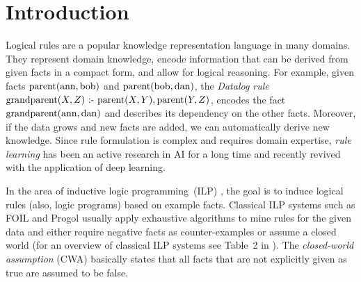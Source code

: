 \section{Introduction}


Logical rules are a popular knowledge representation language in many domains. They represent %
domain knowledge, encode information that can be derived from given facts in a compact form, and allow for logical reasoning.
For example, given facts $\textrm{parent}(\textrm{ann},\textrm{bob})$ and $\textrm{parent}(\textrm{bob},\textrm{dan})$, the \emph{Datalog rule} 
$\textrm{grandparent}(X,Z)\text{ :- }\textrm{parent}(X,Y),\textrm{parent}(Y,Z)$, encodes the fact $\textrm{grandparent}(\textrm{ann},\textrm{dan})$ and describes its dependency on the other facts. Moreover, if the data grows and new facts are added, we can automatically derive new knowledge.
% 
Since rule formulation is complex and requires domain expertise,
\emph{rule learning} \cite{Raedt-08-Logical-and-relational-learning,Fuernkranz+-12-Foundations-of-Rule-Learning} %
has been an active research in AI for a long time %
and recently revived with the application of deep learning. %

In the area of %
{inductive logic programming}~(ILP) \cite{Muggleton-NGC91:ilp}, %
the goal is to induce logical rules (also, logic programs) based on example facts. 
Classical ILP systems such as FOIL \cite{Quinlan-ML90:foil} and Progol \cite{Muggleton-NGC95:progol} usually apply exhaustive algorithms to mine rules for the given data and either require negative facts as
counter-examples or assume a closed world (for an overview of classical ILP systems see Table~2 in \cite{SteGaHo-RR18:overview}).
The \emph{closed-world assumption} (CWA) basically states that all facts %
that are not explicitly given as true are assumed to be false.

